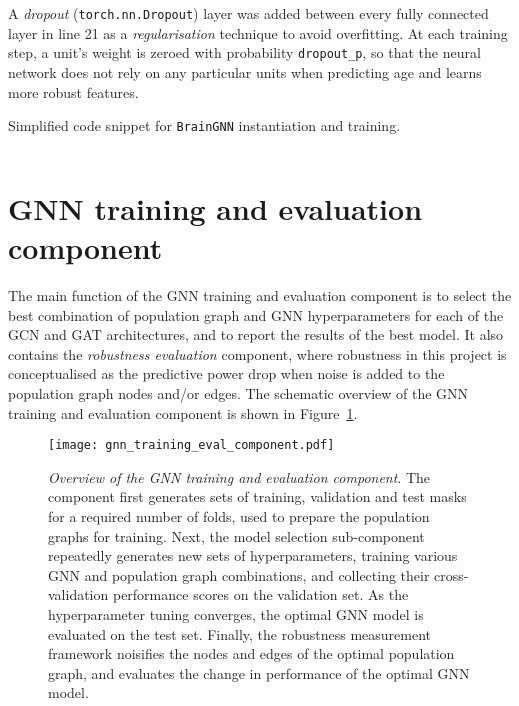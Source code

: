 A \textit{dropout} (\texttt{torch.nn.Dropout}) layer was added between every fully connected layer in line 21 as a \textit{regularisation} technique to avoid overfitting. At each training step, a unit's weight is zeroed with probability \texttt{dropout\_p}, so that the neural network does not rely on any particular units when predicting age and learns more robust features.

\bigskip
\begin{code}
\caption{Simplified code snippet for \texttt{BrainGNN} instantiation and training.}
\label{listing:braingnn}
\medskip
\inputminted[frame=lines, linenos, breaklines=true, numberblanklines=false, style=colorful]{python}{code/brain_gnn_snippet.py}
\end{code}


\section{GNN training and evaluation component}
\label{section:gnn-train-evaluate}

The main function of the GNN training and evaluation component is to select the best combination of population graph and GNN hyperparameters for each of the GCN and GAT architectures, and to report the results of the best model. It also contains the \textit{robustness evaluation} component, where robustness in this project is conceptualised as the predictive power drop when noise is added to the population graph nodes and/or edges. The schematic overview of the GNN training and evaluation component is shown in Figure~\ref{gnn-training-eval-component}.

\begin{figure}[h]
    \centering
    \texttt{[image: gnn\_training\_eval\_component.pdf]}
    \caption{\textit{Overview of the GNN training and evaluation component}.
    The component first generates sets of training, validation and test masks for a required number of folds, used to prepare the population graphs for training. Next, the model selection sub-component repeatedly generates new sets of hyperparameters, training various GNN and population graph combinations, and collecting their cross-validation performance scores on the validation set. As the hyperparameter tuning converges, the optimal GNN model is evaluated on the test set. Finally, the robustness measurement framework noisifies the nodes and edges of the optimal population graph, and evaluates the change in performance of the optimal GNN model.
    }\label{gnn-training-eval-component}
\end{figure}

